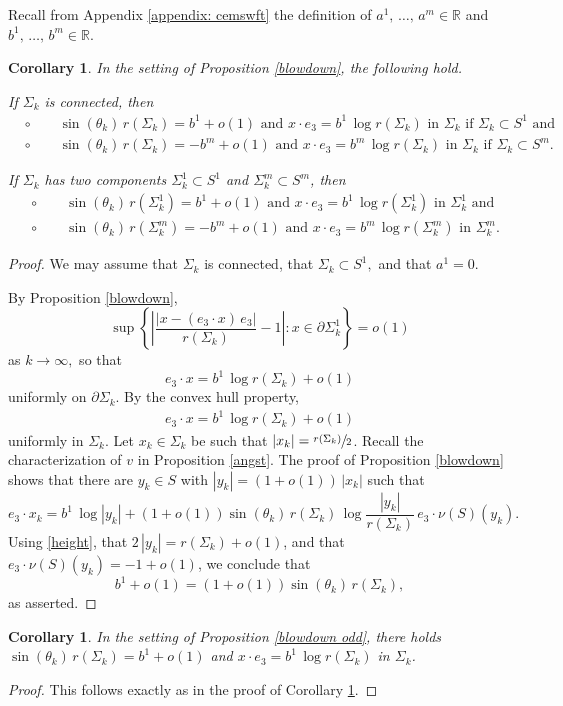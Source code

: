 \documentclass[11pt]{amsart}
\newtheorem{coro}[prop]{Corollary}
\begin{document}
Recall from Appendix \ref{appendix: cemswft} the definition of $a^1,\,\ldots,\,a^m\in \mathbb{R}$ and $b^1,\,\ldots,\,b^m\in \mathbb{R}$.  
\begin{coro} \label{sin vs r}
In the setting of Proposition \ref{blowdown}, the following hold.

 If $\Sigma_k$ is connected, then 
\begin{align*} 
&\circ\qquad  \text{$\sin(\theta_k)\,r(\Sigma_k)=b^1+o(1)$ and $x\cdot e_3=b^1\,\log r(\Sigma_k)$ in $\Sigma_k$ if $\Sigma_k\subset S^1$ and } \\
&\circ \qquad \text{$\sin(\theta_k)\,r(\Sigma_k)=-b^m+o(1)$ and $x\cdot e_3=b^m\,\log r(\Sigma_k)$ in $\Sigma_k$ if $\Sigma_k\subset S^m$.}
 \end{align*} 

 If $\Sigma_k$ has two components $\Sigma^1_k\subset S^1$ and $\Sigma^m_k\subset S^m$, then
\begin{align*} 
	&\circ\qquad  \text{$\sin(\theta_k)\,r(\Sigma^1_k)=b^1+o(1)$ and $x\cdot e_3=b^1\,\log r(\Sigma^1_k)$ in $\Sigma^1_k$ and } \\
	&\circ \qquad \text{$\sin(\theta_k)\,r(\Sigma^m_k)=-b^m+o(1)$ and $x\cdot e_3=b^m\,\log r(\Sigma^m_k)$ in $\Sigma^m_k$.}
\end{align*} 

\end{coro}
\begin{proof}
	We may assume that $\Sigma_k$ is connected, that $\Sigma_k\subset S^1,$ and that  $a^1=0$.
	
	By Proposition \ref{blowdown},
	$$
\sup\left \{\left|\frac{|x-(e_3\cdot x)\,e_3|}{r(\Sigma_k)}-1\right|:x\in \partial \Sigma_k^1\right \}=o(1)
	$$
as $k\to\infty,$ so that
$$
e_3\cdot x=b^1\,\log r(\Sigma_k)+o(1)
$$
uniformly on $\partial \Sigma_k$. By the convex hull property, 
\begin{align} \label{height}  
	e_3\cdot x=b^1\,\log r(\Sigma_k)+o(1)
\end{align} 
uniformly in $\Sigma_k$. Let $x_k\in \Sigma_k$ be such that $|x_k|=\sfrac{r(\Sigma_k)}2$. Recall the characterization of $v$ in Proposition \ref{angst}. The  proof of Proposition \ref{blowdown}   shows that  there are $y_k\in S$ with  $|y_k|=(1+o(1))\,|x_k|$ such that
$$
e_3\cdot x_k=b^1\,\log|y_k|+(1+o(1))\sin(\theta_k)\,r(\Sigma_k)\,\log\frac{|y_k|}{r(\Sigma_k)}\,e_3\cdot \nu(S)(y_k).
$$
Using \eqref{height}, that $2\,|y_k|=r(\Sigma_k)+o(1)$, and that $e_3\cdot \nu(S)(y_k)=-1+o(1)$, we conclude that 
$$
b^1+o(1)=(1+o(1))\sin(\theta_k)\,r(\Sigma_k),
$$
as asserted.

\end{proof}
\begin{coro} \label{sin vs r odd}
	In the setting of Proposition \ref{blowdown odd}, there holds $\sin(\theta_k)\,r(\Sigma_k)=b^1+o(1)$ and $x\cdot e_3=b^1\,\log r(\Sigma_k)$ in $\Sigma_k$.
\end{coro}
\begin{proof}
	This follows exactly as in the proof of Corollary \ref{sin vs r}.
\end{proof}
\end{document}
